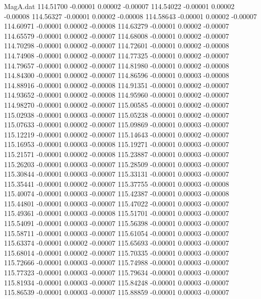\begin{filecontents}{MagA.dat}
 114.51700   -0.00001    0.00002   -0.00007
 114.54022   -0.00001    0.00002   -0.00008
 114.56327   -0.00001    0.00002   -0.00008
 114.58643   -0.00001    0.00002   -0.00007
 114.60971   -0.00001    0.00002   -0.00008
 114.63279   -0.00001    0.00002   -0.00007
 114.65579   -0.00001    0.00002   -0.00007
 114.68008   -0.00001    0.00002   -0.00007
 114.70298   -0.00001    0.00002   -0.00007
 114.72601   -0.00001    0.00002   -0.00008
 114.74908   -0.00001    0.00002   -0.00007
 114.77325   -0.00001    0.00002   -0.00007
 114.79657   -0.00001    0.00002   -0.00007
 114.81980   -0.00001    0.00002   -0.00008
 114.84300   -0.00001    0.00002   -0.00007
 114.86596   -0.00001    0.00003   -0.00008
 114.88916   -0.00001    0.00002   -0.00008
 114.91351   -0.00001    0.00002   -0.00007
 114.93652   -0.00001    0.00002   -0.00008
 114.95960   -0.00001    0.00002   -0.00007
 114.98270   -0.00001    0.00002   -0.00007
 115.00585   -0.00001    0.00002   -0.00007
 115.02938   -0.00001    0.00003   -0.00007
 115.05238   -0.00001    0.00002   -0.00007
 115.07633   -0.00001    0.00002   -0.00007
 115.09869   -0.00001    0.00003   -0.00007
 115.12219   -0.00001    0.00002   -0.00007
 115.14643   -0.00001    0.00002   -0.00007
 115.16953   -0.00001    0.00003   -0.00008
 115.19271   -0.00001    0.00003   -0.00007
 115.21571   -0.00001    0.00002   -0.00008
 115.23887   -0.00001    0.00003   -0.00007
 115.26203   -0.00001    0.00003   -0.00007
 115.28509   -0.00001    0.00003   -0.00007
 115.30844   -0.00001    0.00003   -0.00007
 115.33131   -0.00001    0.00003   -0.00007
 115.35441   -0.00001    0.00002   -0.00007
 115.37755   -0.00001    0.00003   -0.00008
 115.40074   -0.00001    0.00003   -0.00007
 115.42387   -0.00001    0.00003   -0.00008
 115.44801   -0.00001    0.00003   -0.00007
 115.47022   -0.00001    0.00003   -0.00007
 115.49361   -0.00001    0.00003   -0.00008
 115.51701   -0.00001    0.00003   -0.00007
 115.54091   -0.00001    0.00003   -0.00007
 115.56398   -0.00001    0.00003   -0.00007
 115.58711   -0.00001    0.00003   -0.00007
 115.61054   -0.00001    0.00003   -0.00007
 115.63374   -0.00001    0.00002   -0.00007
 115.65693   -0.00001    0.00003   -0.00007
 115.68014   -0.00001    0.00002   -0.00007
 115.70335   -0.00001    0.00003   -0.00007
 115.72666   -0.00001    0.00003   -0.00007
 115.74988   -0.00001    0.00003   -0.00007
 115.77323   -0.00001    0.00003   -0.00007
 115.79634   -0.00001    0.00003   -0.00007
 115.81934   -0.00001    0.00003   -0.00007
 115.84248   -0.00001    0.00003   -0.00007
 115.86539   -0.00001    0.00003   -0.00007
 115.88859   -0.00001    0.00003   -0.00007

\end{filecontents}
